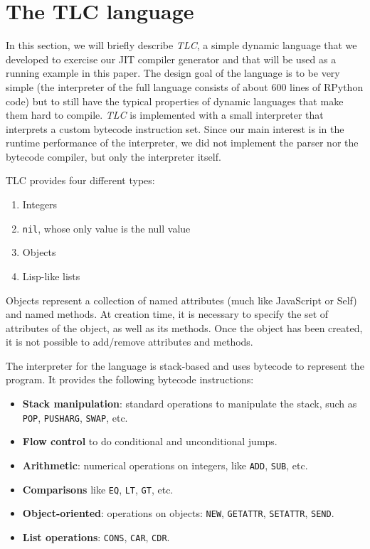 \section{The TLC language}

In this section, we will briefly describe \emph{TLC}, a simple dynamic
language that we developed to exercise our JIT compiler generator and that will
be used as a running example in this paper. The design goal of the language is
to be very simple (the interpreter of the full language consists of about 600
lines of RPython code) but to still have the typical properties of dynamic
languages that make them hard to compile. \emph{TLC} is implemented with a small
interpreter that interprets a custom bytecode instruction set. Since our main
interest is in the runtime performance of the interpreter, we did not implement
the parser nor the bytecode compiler, but only the interpreter itself.

TLC provides four different types:
\begin{enumerate}
\item Integers
\item \lstinline{nil}, whose only value is the null value
\item Objects
\item Lisp-like lists
\end{enumerate}

Objects represent a collection of named attributes (much like JavaScript or
Self) and named methods.  At creation time, it is necessary to specify the set
of attributes of the object, as well as its methods.  Once the object has been
created, it is not possible to add/remove attributes and methods.

The interpreter for the language is stack-based and uses bytecode to represent
the program. It provides the following bytecode instructions:

\begin{itemize}
\item \textbf{Stack manipulation}: standard operations to manipulate the
  stack, such as \lstinline{POP}, \lstinline{PUSHARG}, \lstinline{SWAP}, etc.
\item \textbf{Flow control} to do conditional and unconditional jumps.
\item \textbf{Arithmetic}: numerical operations on integers, like
  \lstinline{ADD}, \lstinline{SUB}, etc.
\item \textbf{Comparisons} like \lstinline{EQ}, \lstinline{LT},
  \lstinline{GT}, etc.
\item \textbf{Object-oriented}: operations on objects: \lstinline{NEW},
  \lstinline{GETATTR}, \lstinline{SETATTR}, \lstinline{SEND}.
\item \textbf{List operations}: \lstinline{CONS}, \lstinline{CAR},
  \lstinline{CDR}.
\end{itemize}

